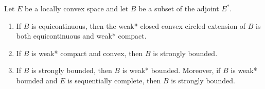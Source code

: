 Let $E$ be a locally convex space and let $B$ be a subset of the adjoint $E^*$.

\begin{enumerate}
\item[(i)] If $B$ is equicontinuous, then the weak* closed convex circled extension of $B$ is both equicontinuous and weak* compact.

\item[(ii)] If $B$ is weak* compact and convex, then $B$ is strongly bounded.

\item[(iii)] If $B$ is strongly bounded, then $B$ is weak* bounded. Moreover, if $B$ is weak* bounded and $E$ is sequentially complete, then $B$ is strongly bounded.
\end{enumerate}
